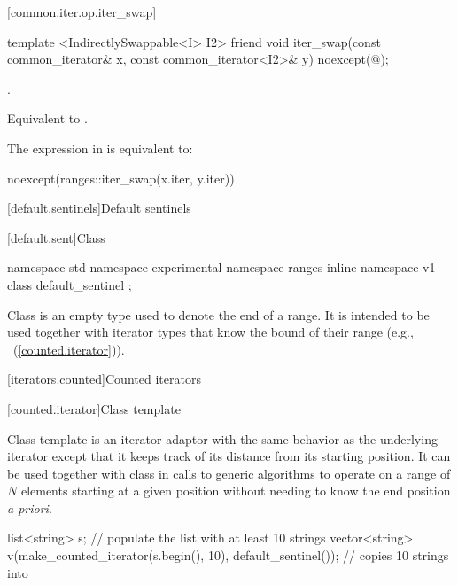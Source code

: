 [common.iter.op.iter_swap]{}

%
%
\begin{itemdecl}
template <IndirectlySwappable<I> I2>
  friend void iter_swap(const common_iterator& x, const common_iterator<I2>& y)
    noexcept(@\seebelow@);
\end{itemdecl}

\begin{itemdescr}
\pnum
\requires {}.

\pnum
\effects Equivalent to .

\pnum
\remarks The expression in  is equivalent to:
\begin{codeblock}
noexcept(ranges::iter_swap(x.iter, y.iter))
\end{codeblock}
\end{itemdescr}


[default.sentinels]{Default sentinels}

[default.sent]{Class }

%
\begin{itemdecl}
namespace std { namespace experimental { namespace ranges { inline namespace v1 {
  class default_sentinel { };
}}}}
\end{itemdecl}

\pnum
Class  is an empty type used to denote the end of a
range. It is intended to be used together with iterator types that know the bound
of their range (e.g., ~(\ref{counted.iterator})).

[iterators.counted]{Counted iterators}

[counted.iterator]{Class template }

\pnum
Class template  is an iterator adaptor
with the same behavior as the underlying iterator except that it
keeps track of its distance from its starting position. It can be
used together with class  in calls to generic
algorithms to operate on a range of $N$ elements starting at a given
position without needing to know the end position \textit{a priori}.

\pnum
\enterexample

\begin{codeblock}
list<string> s;
// populate the list  with at least 10 strings
vector<string> v(make_counted_iterator(s.begin(), 10),
                 default_sentinel()); // copies 10 strings into 
\end{codeblock}
\exitexample

